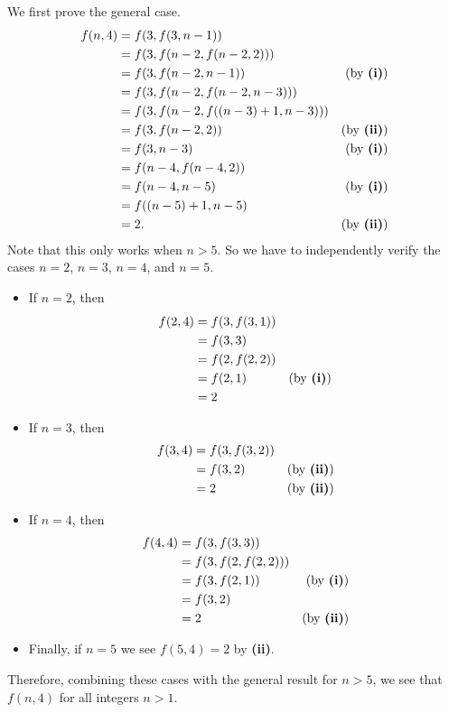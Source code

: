 \begin{questions}
\begin{partquestions}{\roman*}
        \item We first prove the general case.
        \begin{align*}
            f(n, 4) &= f(3, f(3, n-1))\\
            &= f(3, f(n-2, f(n-2, 2)))\\
            &= f(3, f(n-2, n-1)) & (\text{by \textbf{(i)}})\\
            &= f(3, f(n-2, f(n-2, n-3)))\\
            &= f(3, f(n-2, f((n-3)+1, n-3)))\\
            &= f(3, f(n-2, 2)) & (\text{by \textbf{(ii)}})\\
            &= f(3, n-3) & (\text{by \textbf{(i)}})\\
            &= f(n-4, f(n-4, 2))\\
            &= f(n-4, n-5) & (\text{by \textbf{(i)}})\\
            &= f((n-5)+1, n-5)\\
            &= 2. & (\text{by \textbf{(ii)}})
        \end{align*}
        Note that this only works when $n > 5$. So we have to independently verify the cases $n = 2$, $n = 3$, $n = 4$, and $n = 5$.
        \begin{itemize}
            \item If $n = 2$, then
            \begin{align*}
                f(2, 4) &= f(3, f(3, 1))\\
                &= f(3, 3)\\
                &= f(2, f(2, 2))\\
                &= f(2, 1) & (\text{by \textbf{(i)}})\\
                &= 2
            \end{align*}
            \item If $n = 3$, then
            \begin{align*}
                f(3, 4) &= f(3, f(3, 2))\\
                &= f(3, 2) & (\text{by \textbf{(ii)}})\\
                &= 2 & (\text{by \textbf{(ii)}})
            \end{align*}
            \item If $n = 4$, then
            \begin{align*}
                f(4, 4) &= f(3, f(3, 3))\\
                &= f(3, f(2, f(2, 2)))\\
                &= f(3, f(2, 1)) & (\text{by \textbf{(i)}})\\
                &= f(3, 2)\\
                &= 2 & (\text{by \textbf{(ii)}})
            \end{align*}
            \item Finally, if $n = 5$ we see $f(5, 4) = 2$ by \textbf{(ii)}.
        \end{itemize}
        Therefore, combining these cases with the general result for $n > 5$, we see that $f(n, 4)$ for all integers $n > 1$.
    \end{partquestions}


\end{questions}
